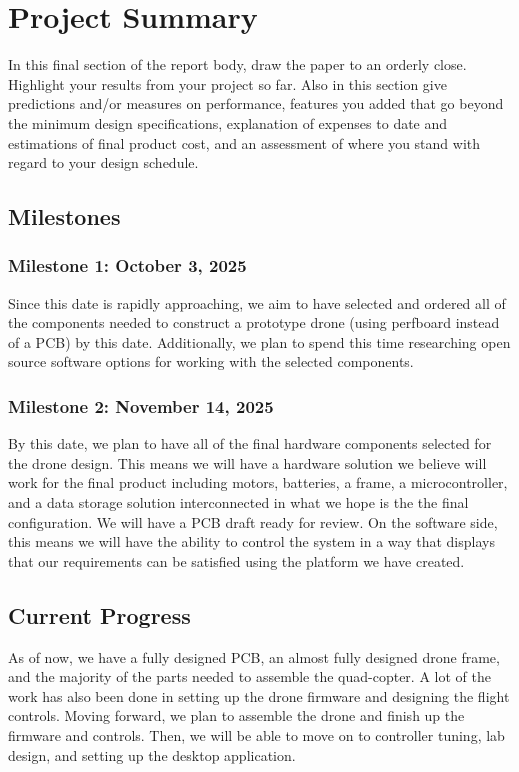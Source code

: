 \documentclass[12pt, titlepage]{article}
\begin{document}
\section{Project Summary}
In this final section of the report body, draw the paper to an orderly close. Highlight your results from your project so far. Also in this section give predictions and/or measures on performance, features you added that go beyond the minimum design specifications, explanation of expenses to date and estimations of final product cost, and an assessment of where you stand with regard to your design schedule.

\subsection{Milestones}

\subsubsection[October 3, 2025]{Milestone 1: October 3, 2025} Since this date is rapidly approaching, we aim to have selected and ordered all of the components needed to construct a prototype drone (using perfboard instead of a PCB) by this date. Additionally, we plan to spend this time researching open source software options for working with the selected components. \\

\subsubsection[November 14, 2025]{Milestone 2: November 14, 2025} By this date, we plan to have all of the final hardware components selected for the drone design. This means we will have a hardware solution we believe will work for the final product including motors, batteries, a frame, a microcontroller, and a data storage solution interconnected in what we hope is the the final configuration. We will have a PCB draft ready for review. On the software side, this means we will have the ability to control the system in a way that displays that our requirements can be satisfied using the platform we have created.

\subsection{Current Progress}
As of now, we have a fully designed PCB, an almost fully designed drone frame, and the majority of the parts needed to assemble the quad-copter. A lot of the work has also been done in setting up the drone firmware and designing the flight controls. Moving forward, we plan to assemble the drone and finish up the firmware and controls. Then, we will be able to move on to controller tuning, lab design, and setting up the desktop application.
\end{document}

